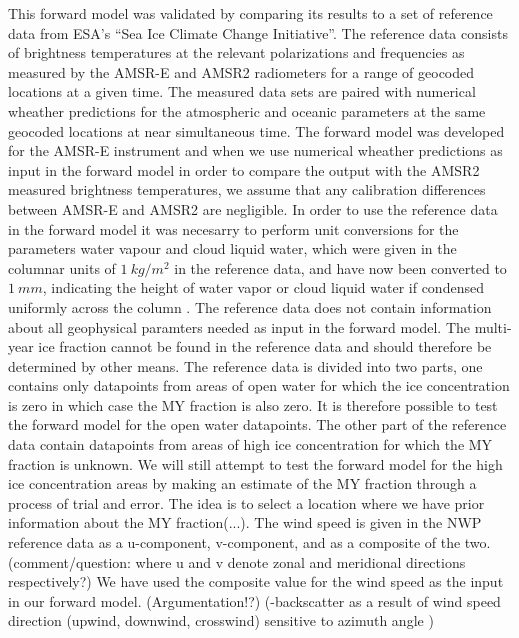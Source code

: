 \documentclass[11pt, a4paper]{article}
\begin{document}
This forward model was validated by comparing its results to a set of reference data from ESA's ``Sea Ice Climate Change Initiative''. The reference data consists of brightness temperatures at the relevant polarizations and frequencies as measured by the AMSR-E and AMSR2 radiometers for a range of geocoded locations at a given time. The measured data sets are paired with numerical wheather predictions for the atmospheric and oceanic parameters at the same geocoded locations at near simultaneous time. \newline
The forward model was developed for the AMSR-E instrument and when we use numerical wheather predictions as input in the forward model in order to compare the output with the AMSR2 measured brightness temperatures, we assume that any calibration differences between AMSR-E and AMSR2 are negligible.  \newline
In order to use the reference data in the forward model it was necesarry to perform unit conversions for the parameters water vapour and cloud liquid water, which were given in the columnar units of $\SI{1}{kg/m^2}$ in the reference data, and have now been converted to $\SI{1}{mm}$, indicating the height of water vapor or cloud liquid water if condensed uniformly across the column \cite{remss}. \newline
The reference data does not contain information about all geophysical paramters needed as input in the forward model. The multi-year ice fraction cannot be found in the reference data and should therefore be determined by other means. The reference data is divided into two parts, one contains only datapoints from areas of open water for which the ice concentration is zero in which case the MY fraction is also zero. It is therefore possible to test the forward model for the open water datapoints. The other part of the reference data contain datapoints from areas of high ice concentration for which the MY fraction is unknown. We will still attempt to test the forward model for the high ice concentration areas by making an estimate of the MY fraction through a process of trial and error. The idea is to select a location where we have prior information about the MY fraction(...). \newline        
The wind speed is given in the NWP reference data as a u-component, v-component, and as a composite of the two. (comment/question: where u and v denote zonal and meridional directions respectively?) We have used the composite value for the wind speed as the input in our forward model. (Argumentation!?) (-backscatter as a result of wind speed direction (upwind, downwind, crosswind) sensitive to azimuth angle \cite{Elachi})       
\end{document}
